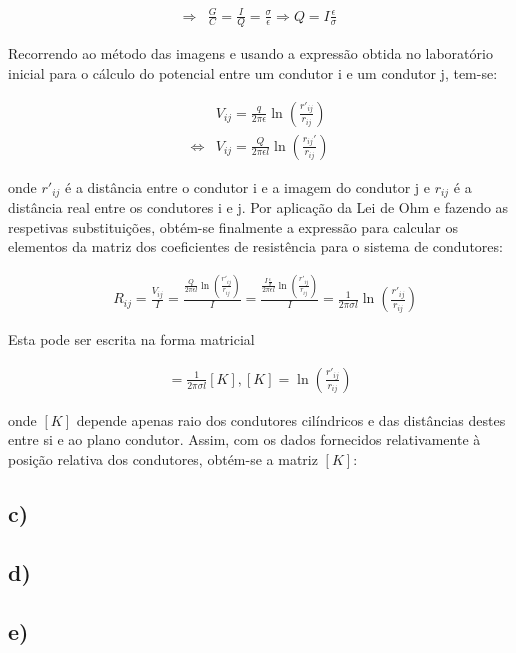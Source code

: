 \documentclass[portuguese, a4paper, titlepage]{article}
\newcommand{\eq}{\Leftrightarrow} %
\begin{document}
	\begin{align*}
		\Rightarrow &\frac{G}{C} = \frac{I}{Q} = \frac{\sigma}{\epsilon} \Rightarrow Q = I\frac{\epsilon}{\sigma}
	\end{align*}
	
	Recorrendo ao método das imagens e usando a expressão obtida no laboratório inicial para o cálculo do potencial entre um condutor i e um condutor j, tem-se:
	
	\begin{align*}
		&V_{ij} =  \frac{q}{2\pi\epsilon} \ln\left(\frac{r'_{ij} }{r_{ij} }\right) \\
		\eq &V_{ij}  = \frac{Q}{2\pi\epsilon l} \ln\left(\frac{r_{ij} '}{r_{ij} }\right)
	\end{align*}
	
	onde $r'_{ij}$ é a distância entre o condutor i e a imagem do condutor j e $r_{ij}$ é a distância real entre os condutores i e j. Por aplicação da Lei de Ohm e fazendo as respetivas substituições, obtém-se finalmente a expressão para calcular os elementos da matriz dos coeficientes de resistência para o sistema de condutores:
	
	\begin{align*}
		&R_{ij}  = \frac{V_{ij} }{I} = \frac{\frac{Q}{2\pi\epsilon l} \ln\left(\frac{r'_{ij} }{r_{ij} }\right)}{I} = \frac{\frac{I\frac{\epsilon}{\sigma}}{2\pi\epsilon l} \ln\left(\frac{r'_{ij} }{r_{ij} }\right)}{I} = \frac{1}{2\pi\sigma l}\ln\left(\frac{r'_{ij} }{r_{ij} }\right)
	\end{align*}
	
	Esta pode ser escrita na forma matricial
	
	\begin{align*}
		[R] = \frac{1}{2\pi\sigma l} [K], [K] = \ln\left(\frac{r'_{ij} }{r_{ij} }\right) 
	\end{align*}
	
	onde $[K]$ depende apenas raio dos condutores cilíndricos e das distâncias destes entre si e ao plano condutor. Assim, com os dados fornecidos relativamente à posição relativa dos condutores, obtém-se a matriz $[K]$:

	
	\subsection{c)}

	\subsection{d)}

	\subsection{e)}


\end{document}
